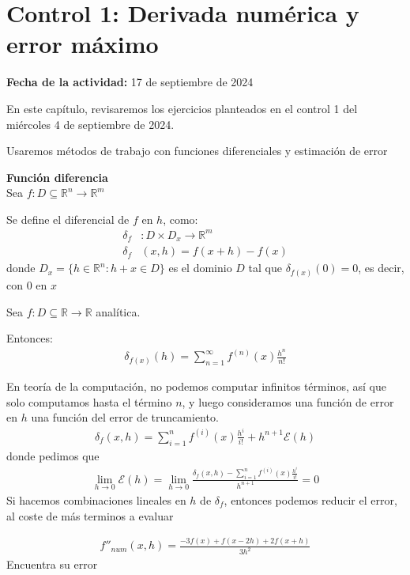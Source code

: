 \chapter{Control 1: Derivada numérica y error máximo}\label{ch:Control1}


\hfill \textbf{Fecha de la actividad:} 17 de septiembre de 2024

\medskip

En este capítulo, revisaremos los ejercicios planteados en el control 1 del miércoles 4 de septiembre de 2024.

Usaremos métodos de trabajo con funciones diferenciales y estimación de error

\begin{definition} \textbf{Función diferencia}\\
Sea $f:D\subseteq\mathbb{R}^n\to\mathbb{R}^m$

Se define el diferencial de $f$ en $h$, como:
\begin{align*}
    \delta_{f}&:D\times D_x\to\mathbb{R}^m\\
    \delta_{f}&(x,h)=f(x+h)-f(x)
\end{align*}
donde $D_x=\{h\in\mathbb{R}^n:h+x\in D\}$ es el dominio $D$ tal que $\delta_{f(x)}(0)=0$, es decir, con $0$ en $x$
\end{definition}
\begin{theorem}
    Sea $f:D\subseteq\mathbb{R}\to\mathbb{R}$ analítica.
    
    Entonces:
    \begin{align*}
        \delta_{f(x)}(h)=\sum_{n=1}^\infty f^{(n)}(x)\frac{h^n}{n!}
    \end{align*}
\end{theorem}
En teoría de la computación, no podemos computar infinitos términos, así que solo computamos hasta el término $n$, y luego consideramos una función de error en $h$ una función del error de truncamiento.
\begin{align*}
    \delta_{f}(x,h)=\sum_{i=1}^n f^{(i)}(x)\frac{h^{i}}{i!} + h^{n+1}\mathcal{E}(h)
\end{align*}
donde pedimos que
\begin{align*}
    \lim_{h\to 0} \mathcal{E}(h)=\lim_{h\to 0}\frac{\delta_f(x,h)-\sum_{i=1}^n f^{(i)}(x)\frac{h^{i}}{i!}}{h^{n+1}}=0
\end{align*}
Si hacemos combinaciones lineales en $h$ de $\delta_f$, entonces podemos reducir el error, al coste de más terminos a evaluar
\newpage
\begin{exercise}
\begin{align*}
    f''_{num}(x,h)=\frac{-3f(x)+f(x-2h)+2f(x+h)}{3h^2}
\end{align*}
Encuentra su error
\end{exercise}

